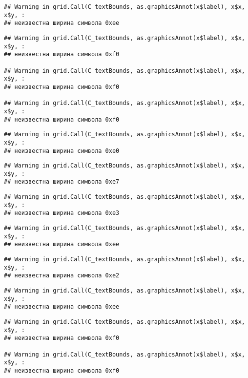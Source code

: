 \documentclass[
]{article}
\begin{document}
\begin{verbatim}
## Warning in grid.Call(C_textBounds, as.graphicsAnnot(x$label), x$x, x$y, :
## неизвестна ширина символа 0xee
\end{verbatim}

\begin{verbatim}
## Warning in grid.Call(C_textBounds, as.graphicsAnnot(x$label), x$x, x$y, :
## неизвестна ширина символа 0xf0

## Warning in grid.Call(C_textBounds, as.graphicsAnnot(x$label), x$x, x$y, :
## неизвестна ширина символа 0xf0

## Warning in grid.Call(C_textBounds, as.graphicsAnnot(x$label), x$x, x$y, :
## неизвестна ширина символа 0xf0
\end{verbatim}

\begin{verbatim}
## Warning in grid.Call(C_textBounds, as.graphicsAnnot(x$label), x$x, x$y, :
## неизвестна ширина символа 0xe0
\end{verbatim}

\begin{verbatim}
## Warning in grid.Call(C_textBounds, as.graphicsAnnot(x$label), x$x, x$y, :
## неизвестна ширина символа 0xe7
\end{verbatim}

\begin{verbatim}
## Warning in grid.Call(C_textBounds, as.graphicsAnnot(x$label), x$x, x$y, :
## неизвестна ширина символа 0xe3
\end{verbatim}

\begin{verbatim}
## Warning in grid.Call(C_textBounds, as.graphicsAnnot(x$label), x$x, x$y, :
## неизвестна ширина символа 0xee
\end{verbatim}

\begin{verbatim}
## Warning in grid.Call(C_textBounds, as.graphicsAnnot(x$label), x$x, x$y, :
## неизвестна ширина символа 0xe2
\end{verbatim}

\begin{verbatim}
## Warning in grid.Call(C_textBounds, as.graphicsAnnot(x$label), x$x, x$y, :
## неизвестна ширина символа 0xee
\end{verbatim}

\begin{verbatim}
## Warning in grid.Call(C_textBounds, as.graphicsAnnot(x$label), x$x, x$y, :
## неизвестна ширина символа 0xf0

## Warning in grid.Call(C_textBounds, as.graphicsAnnot(x$label), x$x, x$y, :
## неизвестна ширина символа 0xf0
\end{verbatim}
\end{document}
